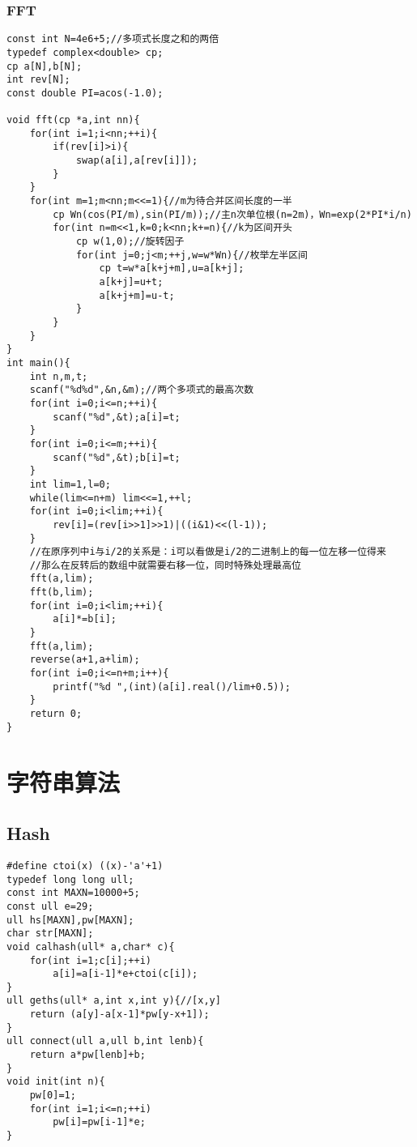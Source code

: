 \documentclass[UTF8]{ctexart}
\begin{document}
\subsubsection{FFT}
\begin{lstlisting}  
const int N=4e6+5;//多项式长度之和的两倍 
typedef complex<double> cp;
cp a[N],b[N];
int rev[N];
const double PI=acos(-1.0);

void fft(cp *a,int nn){
    for(int i=1;i<nn;++i){
        if(rev[i]>i){
            swap(a[i],a[rev[i]]);
        }
    }
    for(int m=1;m<nn;m<<=1){//m为待合并区间长度的一半 
        cp Wn(cos(PI/m),sin(PI/m));//主n次单位根(n=2m)，Wn=exp(2*PI*i/n) 
        for(int n=m<<1,k=0;k<nn;k+=n){//k为区间开头 
            cp w(1,0);//旋转因子 
            for(int j=0;j<m;++j,w=w*Wn){//枚举左半区间 
                cp t=w*a[k+j+m],u=a[k+j];
                a[k+j]=u+t;
                a[k+j+m]=u-t;
            }
        }
    }
}
int main(){
    int n,m,t;
    scanf("%d%d",&n,&m);//两个多项式的最高次数 
    for(int i=0;i<=n;++i){
        scanf("%d",&t);a[i]=t;	
    }
    for(int i=0;i<=m;++i){
        scanf("%d",&t);b[i]=t;
    }
    int lim=1,l=0;
    while(lim<=n+m) lim<<=1,++l;
    for(int i=0;i<lim;++i){
        rev[i]=(rev[i>>1]>>1)|((i&1)<<(l-1));
    }
    //在原序列中i与i/2的关系是：i可以看做是i/2的二进制上的每一位左移一位得来
    //那么在反转后的数组中就需要右移一位，同时特殊处理最高位 
    fft(a,lim);
    fft(b,lim);
    for(int i=0;i<lim;++i){
        a[i]*=b[i];
    }
    fft(a,lim);
    reverse(a+1,a+lim);
    for(int i=0;i<=n+m;i++){
        printf("%d ",(int)(a[i].real()/lim+0.5));
    }
    return 0;
}
\end{lstlisting}
\section{字符串算法}
\subsection{Hash}
\begin{lstlisting}
#define ctoi(x) ((x)-'a'+1)
typedef long long ull;
const int MAXN=10000+5;
const ull e=29;
ull hs[MAXN],pw[MAXN];
char str[MAXN];
void calhash(ull* a,char* c){
    for(int i=1;c[i];++i)
        a[i]=a[i-1]*e+ctoi(c[i]);
}
ull geths(ull* a,int x,int y){//[x,y]
    return (a[y]-a[x-1]*pw[y-x+1]);
}
ull connect(ull a,ull b,int lenb){
    return a*pw[lenb]+b;
}
void init(int n){
    pw[0]=1;
    for(int i=1;i<=n;++i)
        pw[i]=pw[i-1]*e;
}    
\end{lstlisting}
\end{document}
